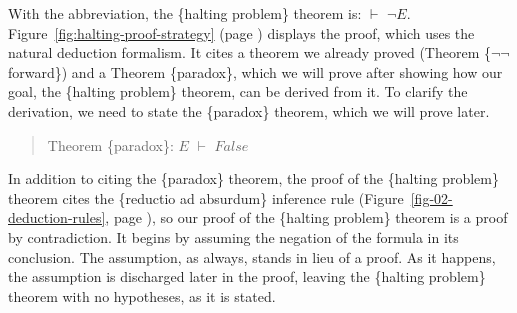 With the abbreviation, the \{halting problem\} theorem is: $\vdash$ $\neg E$.
Figure~\ref{fig:halting-proof-strategy} (page \pageref{fig:halting-proof-strategy})
displays the proof, which uses the natural deduction formalism.
It cites a theorem we already proved (Theorem \{$\neg \neg$ forward\}) and
a Theorem \{paradox\}, which we will prove
after showing how our goal, the \{halting problem\} theorem,
can be derived from it.
To clarify the derivation, we need to state the \{paradox\} theorem,
which we will prove later.
\begin{quote}
Theorem \{paradox\}: $E$ $\vdash$ $False$
\end{quote}

In addition to citing the \{paradox\} theorem,
the proof of the \{halting problem\} theorem
cites the \{reductio ad absurdum\} inference rule
(Figure~\ref{fig-02-deduction-rules}, page \pageref{fig-02-deduction-rules}),
so our proof of the \{halting problem\} theorem is a proof by contradiction.
It begins by assuming the negation of the formula in its conclusion.
The assumption, as always, stands in lieu of a proof.
As it happens, the assumption is discharged later in the proof,
leaving the \{halting problem\} theorem with no hypotheses,
as it is stated.

